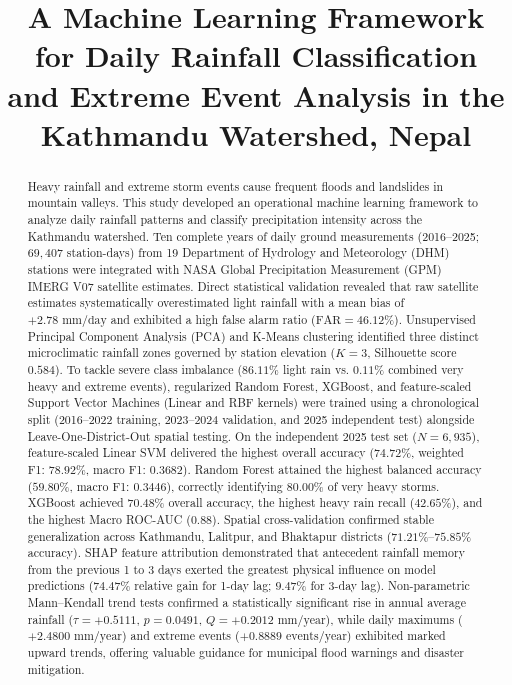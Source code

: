 \documentclass[conference]{IEEEtran}
\title{A Machine Learning Framework for Daily Rainfall Classification and Extreme Event Analysis in the Kathmandu Watershed, Nepal}
\author{
\IEEEauthorblockN{Sadhana Adhikari}
\IEEEauthorblockA{
MSc Data Science and Computational Intelligence\\
Softwarica College of IT and E-Commerce, Coventry University\\
Kathmandu, Nepal\\
Student ID: 260102 \quad CUID: 17625409\\
Email: 260102@softwarica.edu.np
}
}
\begin{document}

\maketitle
\sloppy{}

\begin{abstract}
Heavy rainfall and extreme storm events cause frequent floods and landslides in mountain valleys. This study developed an operational machine learning framework to analyze daily rainfall patterns and classify precipitation intensity across the Kathmandu watershed. Ten complete years of daily ground measurements (2016--2025; $69{,}407$ station-days) from 19 Department of Hydrology and Meteorology (DHM) stations were integrated with NASA Global Precipitation Measurement (GPM) IMERG V07 satellite estimates. Direct statistical validation revealed that raw satellite estimates systematically overestimated light rainfall with a mean bias of $+2.78\text{ mm/day}$ and exhibited a high false alarm ratio ($\text{FAR} = 46.12\%$). Unsupervised Principal Component Analysis (PCA) and K-Means clustering identified three distinct microclimatic rainfall zones governed by station elevation ($K=3$, Silhouette score $0.584$). To tackle severe class imbalance ($86.11\%$ light rain vs. $0.11\%$ combined very heavy and extreme events), regularized Random Forest, XGBoost, and feature-scaled Support Vector Machines (Linear and RBF kernels) were trained using a chronological split (2016--2022 training, 2023--2024 validation, and 2025 independent test) alongside Leave-One-District-Out spatial testing. On the independent 2025 test set ($N = 6{,}935$), feature-scaled Linear SVM delivered the highest overall accuracy ($74.72\%$, weighted F1: $78.92\%$, macro F1: $0.3682$). Random Forest attained the highest balanced accuracy ($59.80\%$, macro F1: $0.3446$), correctly identifying $80.00\%$ of very heavy storms. XGBoost achieved $70.48\%$ overall accuracy, the highest heavy rain recall ($42.65\%$), and the highest Macro ROC-AUC ($0.88$). Spatial cross-validation confirmed stable generalization across Kathmandu, Lalitpur, and Bhaktapur districts ($71.21\%$--$75.85\%$ accuracy). SHAP feature attribution demonstrated that antecedent rainfall memory from the previous 1 to 3 days exerted the greatest physical influence on model predictions ($74.47\%$ relative gain for 1-day lag; $9.47\%$ for 3-day lag). Non-parametric Mann--Kendall trend tests confirmed a statistically significant rise in annual average rainfall ($\tau = +0.5111$, $p = 0.0491$, $Q = +0.2012\text{ mm/year}$), while daily maximums ($+2.4800\text{ mm/year}$) and extreme events ($+0.8889\text{ events/year}$) exhibited marked upward trends, offering valuable guidance for municipal flood warnings and disaster mitigation.
\end{abstract}
\end{document}
